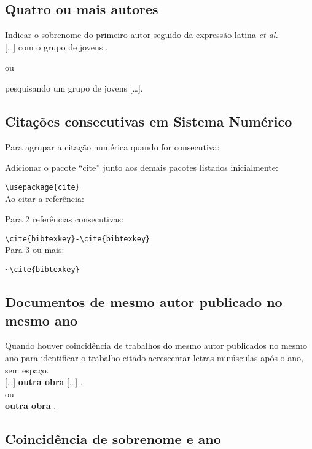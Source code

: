 \subsection{Quatro ou mais autores}

Indicar o sobrenome do primeiro autor seguido da expressão latina \textit{et al.}\\

[\ldots]  com o grupo de jovens \cite{Sena2012}.

ou

 pesquisando um grupo de jovens [\ldots].\\

\subsection{Citações consecutivas em Sistema Numérico}

Para agrupar a citação numérica quando for consecutiva:

Adicionar o pacote “cite” junto aos demais pacotes listados inicialmente:

\verb+\usepackage{cite}+ \\

Ao citar a referência:

Para 2 referências consecutivas: 

\verb+\cite{bibtexkey}-\cite{bibtexkey}+ \\

Para 3 ou mais: 

\verb+~\cite{bibtexkey}+ \\

\subsection{Documentos de mesmo autor publicado no mesmo ano}

Quando houver coincidência de trabalhos do mesmo autor publicados
no mesmo ano para identificar o trabalho citado acrescentar letras minúsculas após o ano, sem espaço.\\

[\ldots] \cite{Garcia2013b}   \textbf{\underline{outra obra}}   [\ldots] \cite{Garcia2013a}. \\

ou\\

  \textbf{\underline{outra obra}}   .

\subsection{Coincidência de sobrenome e ano}

